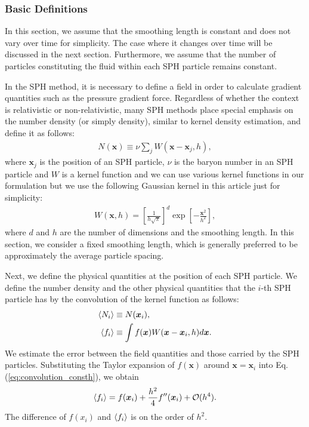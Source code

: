 \documentclass[]{aastex631}
\begin{document}
\subsubsection{Basic Definitions}
In this section, we assume that the smoothing length is constant and does not vary over time for simplicity.
The case where it changes over time will be discussed in the next section.
Furthermore, we assume that the number of particles constituting the fluid within each SPH particle remains constant.

In the SPH method, it is necessary to define a field in order to calculate gradient quantities such as the pressure gradient force.
Regardless of whether the context is relativistic or non-relativistic, many SPH methods place special emphasis on the number density (or simply density), similar to kernel density estimation, and define it as follows:
\begin{align}
    N(\bm{x})\equiv \nu \sum_j W(\bm{x}-\bm{x}_j,h),
\end{align}
where $\bm{x}_j$ is the position of an SPH particle, $\nu$ is the baryon number in an SPH particle and $W$ is a kernel function and we can use various kernel functions in our formulation but we use the following Gaussian kernel in this article just for simplicity:
\begin{align}
    W(\bm{x},h) = \left[ \frac{1}{h \sqrt{\pi}} \right]^d\exp \left[ -\frac{\bm{x}^2}{h^2} \right],
\end{align}
where $d$ and $h$ are the number of dimensions and the smoothing length.
In this section, we consider a fixed smoothing length, which is generally preferred to be approximately the average particle spacing.

Next, we define the physical quantities at the position of each SPH particle.
We define the number density and the other physical quantities that the $i$-th SPH particle has by the convolution of the kernel function as follows:
\begin{align}
    \ev{N_i}&\equiv N(\bm{x}_i),\\
    \label{eq:convolution_consth}
    \ev{f_i}&\equiv \int f(\bm{x})W(\bm{x}-\bm{x}_i,h)d\bm{x}.
\end{align}
We estimate the error between the field quantities and those carried by the SPH particles.
Substituting the Taylor expansion of $f(\bm{x})$ around $\bm{x} = \bm{x}_i$ into Eq.(\ref{eq:convolution_consth}), we obtain
\begin{align}
    \label{eq:accuracy}
    \ev{f_i} = f(\bm{x}_i) + \frac{h^2}{4}f''(\bm{x}_i) + \mathcal{O}(h^4).
\end{align}
The difference of $f(x_i)$ and $\ev{f_i}$ is on the order of $h^2$.
\end{document}
